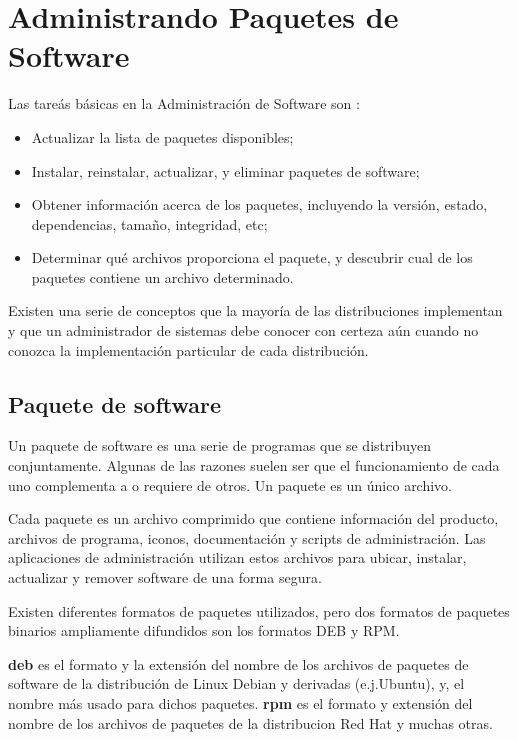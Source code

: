 \documentclass[12pt]{article}
\begin{document}
\section*{Administrando Paquetes de Software}

Las tareás básicas en la Administración de Software son :
\begin{itemize}
\item Actualizar la lista de paquetes disponibles;
\item Instalar, reinstalar, actualizar, y eliminar paquetes de software;
\item Obtener información acerca de los paquetes, incluyendo la versión, estado, dependencias, tamaño, integridad, etc;
\item Determinar qué archivos proporciona el paquete, y descubrir cual de los paquetes contiene un archivo determinado.
\end{itemize}

Existen una serie de conceptos que la 
mayoría de las distribuciones implementan y que un administrador de 
sistemas debe conocer con certeza aún cuando no conozca la implementación
particular de cada distribución.  


\subsection*{Paquete de software}


Un paquete de software es una serie de programas que se distribuyen conjuntamente. Algunas de las razones suelen ser que el funcionamiento de cada uno complementa a o requiere de otros. Un paquete es un único archivo.


Cada paquete es un archivo comprimido que contiene información del producto, archivos de programa, iconos, documentación y scripts de administración. Las aplicaciones de administración utilizan estos archivos para ubicar, instalar, actualizar y remover software de una forma segura. 

Existen diferentes formatos de paquetes utilizados, pero 
dos formatos de paquetes binarios ampliamente difundidos son los formatos DEB y RPM.

{\bf deb} es el formato y la extensión del nombre de los archivos de paquetes de software de la distribución de Linux Debian y derivadas (e.j.Ubuntu), y, el nombre más usado para dichos paquetes. 
{\bf rpm} es el formato y extensión del nombre de los archivos de paquetes de la distribucion Red Hat y muchas otras.
\end{document}
